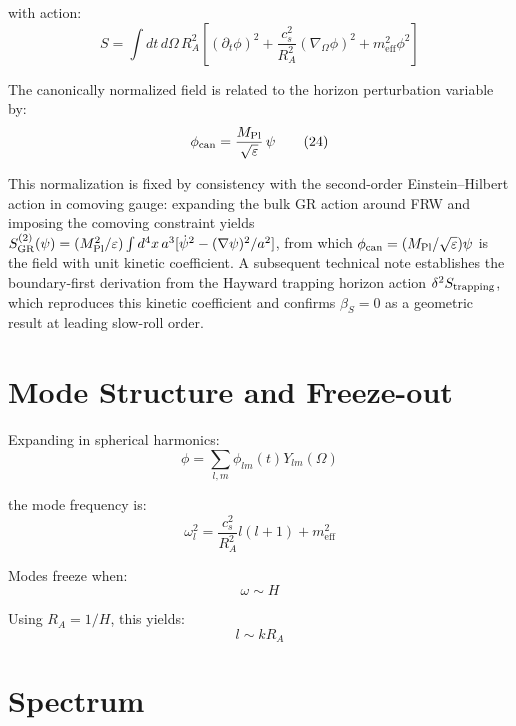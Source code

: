 \documentclass[12pt,a4paper]{article}
\begin{document}
with action:
\begin{equation}
S = \int dt\, d\Omega\, R_A^2 \left[(\partial_t\phi)^2 + \frac{c_s^2}{R_A^2}(\nabla_\Omega\phi)^2 + m_\text{eff}^2\phi^2\right] \tag{23}
\end{equation}

The canonically normalized field is related to the horizon perturbation variable by:
\begin{equation}
\phi_{\rm can} = \frac{M_{\rm Pl}}{\sqrt{\varepsilon}}\,\psi \tag{24}
\end{equation}

This normalization is fixed by consistency with the second-order Einstein--Hilbert action in comoving gauge: expanding the bulk GR action around FRW and imposing the comoving constraint yields $S^{(2)}_{\rm GR}(\psi) = (M_{\rm Pl}^2/\varepsilon)\int d^4x\,a^3[\dot\psi^2 - (\nabla\psi)^2/a^2]$, from which $\phi_{\rm can} = (M_{\rm Pl}/\sqrt{\varepsilon})\psi$ is the field with unit kinetic coefficient. A subsequent technical note establishes the boundary-first derivation from the Hayward trapping horizon action $\delta^2 S_{\rm trapping}$, which reproduces this kinetic coefficient and confirms $\beta_S = 0$ as a geometric result at leading slow-roll order.

\section{Mode Structure and Freeze-out}

Expanding in spherical harmonics:
\begin{equation}
\phi = \sum_{l,m} \phi_{lm}(t) Y_{lm}(\Omega) \tag{25}
\end{equation}

the mode frequency is:
\begin{equation}
\omega_l^2 = \frac{c_s^2}{R_A^2}l(l+1) + m_\text{eff}^2 \tag{26}
\end{equation}

Modes freeze when:
\begin{equation}
\omega \sim H \tag{27}
\end{equation}

Using $R_A = 1/H$, this yields:
\begin{equation}
l \sim kR_A \tag{28}
\end{equation}

\section{Spectrum}
\end{document}
